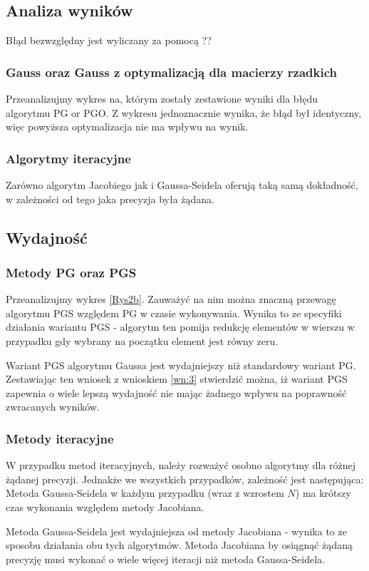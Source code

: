 \documentclass[10pt]{article}
\begin{document}
\subsection{Analiza wyników}
Błąd bezwzględny jest wyliczany za pomocą  ??

\subsubsection{Gauss oraz Gauss z optymalizacją dla macierzy rzadkich}
Przeanalizujmy wykres na, którym zostały zestawione wyniki dla błędu algorytmu PG or PGO. Z wykresu jednoznacznie wynika, że błąd był identyczny, więc powyższa optymalizacja nie ma wpływu na wynik.

\subsubsection{Algorytmy iteracyjne}
Zarówno algorytm Jacobiego jak i Gaussa-Seidela oferują taką samą dokładność, w zależności od tego jaka precyzja była żądana.
\subsection{Wydajność}

\subsubsection{Metody PG oraz PGS}
Przeanalizujmy wykres \ref{Rys2b}. Zauważyć na nim można znaczną przewagę algorytmu PGS względem PG w czasie wykonywania. Wynika to ze specyfiki działania wariantu PGS - algorytm ten pomija redukcję elementów w wierszu w przypadku gdy wybrany na początku element jest równy zeru.
\begin{wniosek}
	Wariant PGS algorytmu Gaussa jest wydajniejszy niż standardowy wariant PG. Zestawiając ten wniosek z wnioskiem \ref{wn:3} stwierdzić można, iż wariant PGS zapewnia o wiele lepszą wydajność nie mając żadnego wpływu na poprawność zwracanych wyników.
\end{wniosek}
\subsubsection{Metody iteracyjne}
W przypadku metod iteracyjnych, należy rozważyć osobno algorytmy dla różnej żądanej precyzji.
Jednakże we wszystkich przypadków, zależność jest następująca: Metoda Gaussa-Seidela w każdym przypadku (wraz z wzrostem $N$) ma krótszy czas wykonania względem metody Jacobiana.
\begin{wniosek}
	Metoda Gaussa-Seidela jest wydajniejsza od metody Jacobiana - wynika to ze sposobu działania obu tych algorytmów. Metoda Jacobiana by osiągnąć żądaną precyzję musi wykonać o wiele więcej iteracji niż metoda Gaussa-Seidela.
\end{wniosek}
\end{document}
